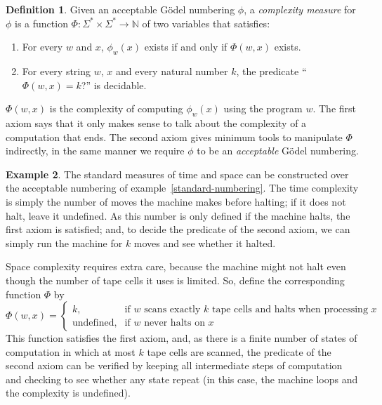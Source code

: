 \documentclass[12pt]{article}
\theoremstyle{definition}
\newtheorem{definition}{Definition}
\newtheorem{example}[definition]{Example}
\begin{document}
\begin{definition}
    Given an acceptable Gödel numbering $\phi$,
    a \emph{complexity measure} for $\phi$
    is a function $\Phi:\Sigma^* \times \Sigma^* \to \mathbb N$ of two variables
    that satisfies: \cite[p.~324]{Blum1967}
    \begin{enumerate}
        \item For every $w$ and $x$,
            $\phi_w(x)$ exists if and only if $\Phi(w, x)$ exists.
        \item For every string $w$, $x$ and every natural number $k$,
            the predicate ``$\Phi(w, x) = k$?'' is decidable.
    \end{enumerate}
\end{definition}

$\Phi(w, x)$ is the complexity of computing $\phi_w(x)$
using the program $w$.
The first axiom says that it only makes sense
to talk about the complexity of a computation that ends.
The second axiom gives minimum tools to manipulate $\Phi$ indirectly,
in the same manner we require $\phi$ to be an \emph{acceptable} Gödel numbering.

\begin{example}
    The standard measures of time and space can be constructed
    over the acceptable numbering of example~\ref{standard-numbering}.
    The time complexity is simply the number of moves the machine makes before halting;
    if it does not halt, leave it undefined.
    As this number is only defined if the machine halts,
    the first axiom is satisfied;
    and, to decide the predicate of the second axiom,
    we can simply run the machine for $k$ moves and see whether it halted.

    Space complexity requires extra care,
    because the machine might not halt
    even though the number of tape cells it uses is limited.
    So, define the corresponding function $\Phi$ by
    \begin{equation*}
        \Phi(w, x) = \begin{cases}
            k, &\text{if $w$ scans exactly $k$ tape cells and halts when processing $x$}\\
            \text{undefined}, &\text{if $w$ never halts on $x$}
        \end{cases}
    \end{equation*}
    This function satisfies the first axiom,
    and, as there is a finite number of states of computation
    in which at most $k$ tape cells are scanned,
    the predicate of the second axiom can be verified
    by keeping all intermediate steps of computation
    and checking to see whether any state repeat
    (in this case, the machine loops and the complexity is undefined).
\end{example}
\end{document}
